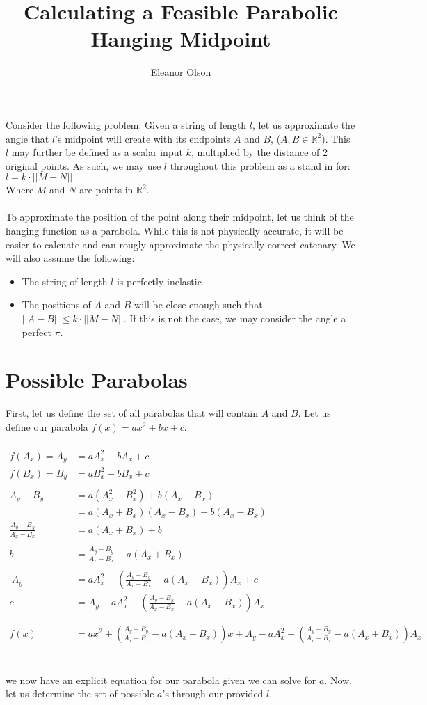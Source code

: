 \documentclass[11pt]{article}
\author{Eleanor Olson}
\title{Calculating a Feasible Parabolic Hanging Midpoint}
\begin{document}
\maketitle
Consider the following problem: Given a string of length $l$, let us approximate the angle that $l$'s midpoint will create with its endpoints $A$ and $B$, ($A, B \in \mathbb{R}^2$). This $l$ may further be defined as a scalar input $k$, multiplied by the distance of 2 original points. As such, we may use $l$ throughout this problem as a stand in for:\\
\indent $l=k\cdot ||M-N||$\\
Where $M$ and $N$ are points in $\mathbb{R}^2$.\\\\
To approximate the position of the point along their midpoint, let us think of the hanging function as a parabola. While this is not physically accurate, it will be easier to calcuate and can rougly approximate the physically correct catenary. We will also assume the following:
\indent\begin{itemize}
\item The string of length $l$ is perfectly inelastic
\item The positions of $A$ and $B$ will be close enough such that $||A-B|| \leq k\cdot ||M-N||$. If this is not the case, we may consider the angle a perfect $\pi$.
\end{itemize}
\newpage
\section{Possible Parabolas}
First, let us define the set of all parabolas that will contain $A$ and $B$. Let us define our parabola $f(x) = ax^2+bx+c$.\\\\
$\begin{aligned}
f(A_x) = A_y &= aA_x^2+bA_x+c\\
f(B_x) = B_y &= aB_x^2+bB_x+c\\\\
A_y-B_y &= a(A_x^2-B_x^2)+b(A_x-B_x)\\
&= a(A_x+B_x)(A_x-B_x)+b(A_x-B_x)\\
\frac{A_y-B_y}{A_x-B_x} &= a(A_x+B_x)+b\\\\
b &= \frac{A_y-B_y}{A_x-B_x}-a(A_x+B_x)\\\\\
A_y&=aA_x^2+\left(\frac{A_y-B_y}{A_x-B_x}-a(A_x+B_x)\right)A_x +c\\
c &= A_y - aA_x^2+\left(\frac{A_y-B_y}{A_x-B_x}-a(A_x+B_x)\right)A_x\\\\\\
f(x) &= ax^2+\left(\frac{A_y-B_y}{A_x-B_x}-a(A_x+B_x)\right)x+A_y - aA_x^2+\left(\frac{A_y-B_y}{A_x-B_x}-a(A_x+B_x)\right)A_x
\end{aligned}$\\\\\\
we now have an explicit equation for our parabola given we can solve for $a$. Now, let us determine the set of possible $a$'s through our provided $l$.
\newpage
\end{document}
